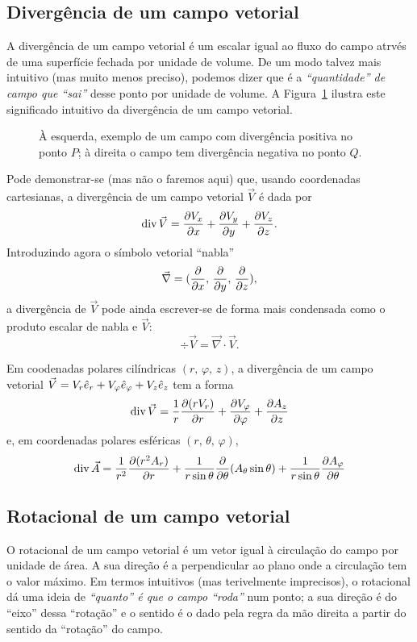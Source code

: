 \subsection*{Divergência de um campo vetorial}
A divergência de um campo vetorial é um escalar igual ao fluxo do campo atrvés
de uma superfície fechada por unidade de volume.  De um modo talvez mais
intuitivo (mas muito menos preciso), podemos dizer que é a \emph{``quantidade''
de campo que ``sai''} desse ponto por unidade de volume. A
Figura~\ref{fig:10-020} ilustra este significado intuitivo da divergência de um
campo vetorial.
\begin{figure}[htb]
  {\centering
    \par
  }
  \caption{À esquerda, exemplo de um campo com divergência positiva no ponto
  $P$; à direita o campo tem divergência negativa no ponto
  $Q$.\label{fig:10-020}}
\end{figure}


Pode demonstrar-se (mas não o faremos aqui) que, usando coordenadas cartesianas,
a divergência de um campo vetorial $\vec V$ é dada por
\begin{equation}\label{eq:divcart}
  \div\vec V=\pd{V_x}{x} + \pd{V_y}{y}+\pd{V_z}{z}.
\end{equation}
Introduzindo agora o símbolo vetorial ``nabla'' 
\begin{equation*}
  \vec \nabla = (\pd{}{x},\, \pd{}{y},\, \pd{}{z}),
\end{equation*}
a divergência de $\vec V$ pode ainda escrever-se de forma mais condensada como
o produto escalar de nabla e $\vec V$:
\begin{equation}
  \div\vec V=\vec\nabla\cdot\vec V.
\end{equation}

Em coodenadas polares cilíndricas $(r,\,\varphi,\,z)$, a divergência de um campo
vetorial $\vec V=V_r\he_r+V_\varphi\he_\varphi+V_z\he_z$ tem a forma
\begin{equation}
\div\vec V=\frac{1}{r}\pd{(rV_r)}{r}+\pd{V_\varphi}{\varphi}+\pd{A_z}{z}
\end{equation}
e, em coordenadas polares esféricas $(r,\,\theta,\,\varphi)$, 
\begin{equation}
\div \vec A=\frac{1}{r^2}\pd{(r^2A_r)}{r}+
    \frac{1}{r\sin\theta}\pd{}{\theta}(A_\theta\sin\theta)+
    \frac{1}{r\sin\theta}\pd{A_\varphi}{\theta}
\end{equation}

\subsection*{Rotacional de um campo vetorial}
O rotacional de um campo vetorial é um vetor igual à circulação do campo por
unidade de área. A sua direção é a perpendicular ao plano onde a circulação tem
o valor máximo. Em termos intuitivos (mas terivelmente imprecisos), o rotacional
dá uma ideia de \emph{``quanto'' é que o campo ``roda''} num ponto; a sua
direção é do ``eixo'' dessa ``rotação'' e o sentido é o dado pela regra da mão
direita a partir do sentido da ``rotação'' do campo. 

